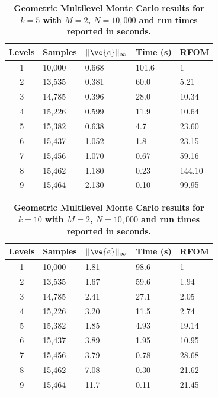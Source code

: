 \documentclass[note]{TechNote}
\begin{document}
\begin{table}[h!]
  \begin{center}
    \begin{tabular}{cllll}\hline\hline
      \multicolumn{1}{c}{\textbf{Levels}} & 
      \multicolumn{1}{l}{\textbf{Samples}} & 
      \multicolumn{1}{l}{\textbf{$||\ve{e}||_{\infty}$}} & 
      \multicolumn{1}{l}{\textbf{Time (s)}} & 
      \multicolumn{1}{l}{\textbf{RFOM}} \\
      \hline
      1 & 10,000 & 0.668 & 101.6 & 1 \\
      2 & 13,535 & 0.381 & 60.0 & 5.21 \\
      3 & 14,785 & 0.396 & 28.0 & 10.34 \\
      4 & 15,226 & 0.599 & 11.9 & 10.64 \\
      5 & 15,382 & 0.638 & 4.7 & 23.60 \\
      6 & 15,437 & 1.052 & 1.8 & 23.15 \\
      7 & 15,456 & 1.070 & 0.67 & 59.16 \\
      8 & 15,462 & 1.180 & 0.23 & 144.10 \\
      9 & 15,464 & 2.130 & 0.10 & 99.95 \\
      \hline\hline
    \end{tabular}
  \end{center}
  \caption{\textbf{Geometric Multilevel Monte Carlo results for $k =
      5$ with $M = 2$, $N = 10,000$ and run times reported in
      seconds.}}
  \label{tab:k5_results}
\end{table}
\begin{table}[h!]
  \begin{center}
    \begin{tabular}{cllll}\hline\hline
      \multicolumn{1}{c}{\textbf{Levels}} & 
      \multicolumn{1}{l}{\textbf{Samples}} & 
      \multicolumn{1}{l}{\textbf{$||\ve{e}||_{\infty}$}} & 
      \multicolumn{1}{l}{\textbf{Time (s)}} & 
      \multicolumn{1}{l}{\textbf{RFOM}} \\
      \hline
      1 & 10,000 & 1.81 & 98.6 & 1 \\
      2 & 13,535 & 1.67 & 59.6 & 1.94 \\
      3 & 14,785 & 2.41 & 27.1 & 2.05 \\
      4 & 15,226 & 3.20 & 11.5 & 2.74 \\
      5 & 15,382 & 1.85 & 4.93 & 19.14 \\
      6 & 15,437 & 3.89 & 1.95 & 10.95 \\
      7 & 15,456 & 3.79 & 0.78 & 28.68 \\
      8 & 15,462 & 7.08 & 0.30 & 21.62 \\
      9 & 15,464 & 11.7 & 0.11 & 21.45 \\
      \hline\hline
    \end{tabular}
  \end{center}
  \caption{\textbf{Geometric Multilevel Monte Carlo results for $k =
      10$ with $M = 2$, $N = 10,000$ and run times reported in
      seconds.}}
  \label{tab:k10_results}
\end{table}
\end{document}
